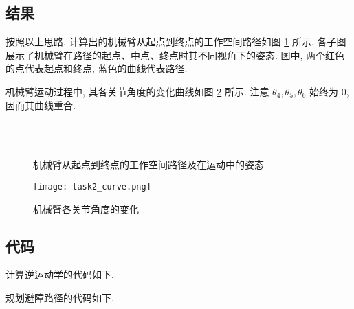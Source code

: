 \documentclass{article}
\begin{document}
\subsection{结果}
按照以上思路, 计算出的机械臂从起点到终点的工作空间路径如图 \ref{path} 所示, 各子图展示了机械臂在路径的起点、中点、终点时其不同视角下的姿态. 图中, 两个红色的点代表起点和终点, 蓝色的曲线代表路径.\par
机械臂运动过程中, 其各关节角度的变化曲线如图 \ref{angle} 所示. 注意 $\theta_4,\theta_5,\theta_6$ 始终为 0, 因而其曲线重合.\par
\begin{figure}[H]
    \centering
    \hspace{3pt}
    \\
    \\
    \hspace{3pt}
    \caption{\label{path}机械臂从起点到终点的工作空间路径及在运动中的姿态}
\end{figure}
\medskip
\begin{figure}[H]
    \centering
    \texttt{[image: task2\_curve.png]}
    \caption{机械臂各关节角度的变化}
    \label{angle}
\end{figure}



\subsection{代码}
计算逆运动学的代码如下.\par
\medskip

\medskip
规划避障路径的代码如下.\par
\medskip

\end{document}
